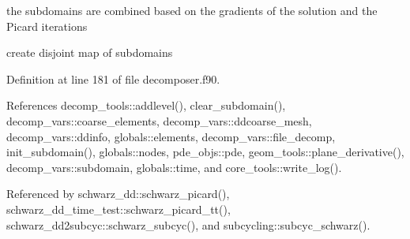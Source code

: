 the subdomains are combined based on the gradients of the solution and the Picard iterations 

create disjoint map of subdomains 

Definition at line 181 of file decomposer.\+f90.



References decomp\+\_\+tools\+::addlevel(), clear\+\_\+subdomain(), decomp\+\_\+vars\+::coarse\+\_\+elements, decomp\+\_\+vars\+::ddcoarse\+\_\+mesh, decomp\+\_\+vars\+::ddinfo, globals\+::elements, decomp\+\_\+vars\+::file\+\_\+decomp, init\+\_\+subdomain(), globals\+::nodes, pde\+\_\+objs\+::pde, geom\+\_\+tools\+::plane\+\_\+derivative(), decomp\+\_\+vars\+::subdomain, globals\+::time, and core\+\_\+tools\+::write\+\_\+log().



Referenced by schwarz\+\_\+dd\+::schwarz\+\_\+picard(), schwarz\+\_\+dd\+\_\+time\+\_\+test\+::schwarz\+\_\+picard\+\_\+tt(), schwarz\+\_\+dd2subcyc\+::schwarz\+\_\+subcyc(), and subcycling\+::subcyc\+\_\+schwarz().


